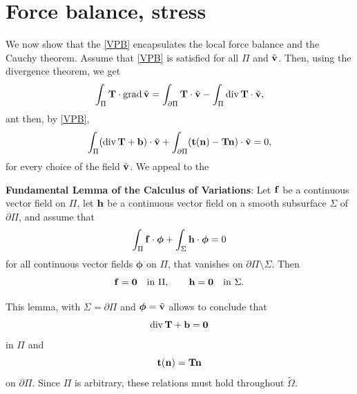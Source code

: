 \section{Force balance, stress}
We now show that the \eqref{VPB} encapsulates the local force balance and the Cauchy theorem.   Assume that \eqref{VPB} is satisfied for all $\Pi$ and $\tilde{\mathbf{v}}$. Then, using the divergence theorem, we get
\begin{equation}
\int_\Pi\mathbf{T} \cdot \operatorname{grad} \tilde{\mathbf{v}}=\int_{\partial\Pi}\mathbf{T}\cdot\tilde{\mathbf{v}}-\int_\Pi\operatorname{div} \mathbf{T} \cdot \tilde{\mathbf{v}},
\end{equation}
ant then, by  \eqref{VPB},
\begin{equation}
\int_\Pi (\operatorname{div}\mathbf{T} +\mathbf{b})\cdot \tilde {\mathbf{v}} +\int_{\partial\Pi}(\mathbf{t}(\mathbf{n})-\mathbf{T}\mathbf{n})\cdot \tilde {\mathbf{v}}=0,
\end{equation}
for every choice of the field $\tilde{\mathbf{v}}$. We appeal to the 
\begin{definition}
\textbf{Fundamental Lemma  of the Calculus of Variations}: Let $\mathbf{f}$ be a continuous vector field on $\Pi$, let $\mathbf{h}$ be a continuous vector field on a smooth subsurface $\Sigma$ of $\partial\Pi$, and assume that
\begin{equation}
\int_{\Pi}\mathbf{f}\cdot\bm{\phi}+\int_{\Sigma}\mathbf{h}\cdot\bm{\phi}=0
\end{equation}
for all continuous vector fields $\bm{\phi}$ on $\Pi$, that vanishes on $\partial\Pi\setminus\Sigma$. Then
\begin{equation}
\mathbf{f}=\mathbf{0} \quad \textrm{in $\Pi$}, \qquad \mathbf{h}=\mathbf{0}\quad \textrm{in $\Sigma$}.
\end{equation}
\end{definition}
This lemma, with $\Sigma=\partial\Pi$ and $\bm{\phi}=\tilde{\mathbf{v}}$ allows to  conclude that
\begin{equation}
\operatorname{div}\mathbf{T} +\mathbf{b}=\mathbf{0}
\end{equation}
in $\Pi$ and 
\begin{equation}
\mathbf{t}(\mathbf{n})=\mathbf{T}\mathbf{n}
\end{equation}
on $\partial\Pi$. Since $\Pi$ is arbitrary, these relations must hold throughout $\widetilde{\Omega}$.



